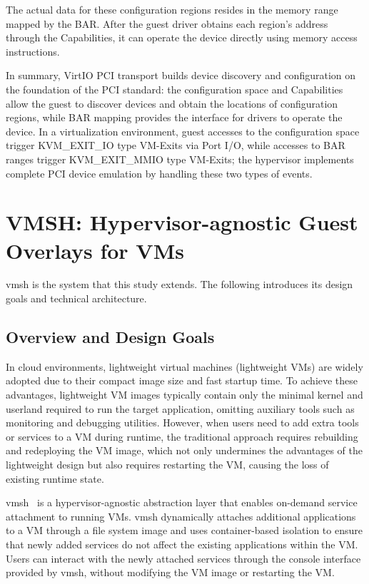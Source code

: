 \begin{ZhChapter}
The actual data for these configuration regions resides in the memory range mapped by the BAR. After the guest driver obtains each region's address through the Capabilities, it can operate the device directly using memory access instructions.

In summary, VirtIO PCI transport builds device discovery and configuration on the foundation of the PCI standard: the configuration space and Capabilities allow the guest to discover devices and obtain the locations of configuration regions, while BAR mapping provides the interface for drivers to operate the device. In a virtualization environment, guest accesses to the configuration space trigger KVM\_EXIT\_IO type VM-Exits via Port I/O, while accesses to BAR ranges trigger KVM\_EXIT\_MMIO type VM-Exits; the hypervisor implements complete PCI device emulation by handling these two types of events.

\section{VMSH: Hypervisor-agnostic Guest Overlays for VMs}
\label{sec:vmsh}

vmsh is the system that this study extends. The following introduces its design goals and technical architecture.

\subsection{Overview and Design Goals}
\label{sec:vmsh-overview}

In cloud environments, lightweight virtual machines (lightweight VMs) are widely adopted due to their compact image size and fast startup time. To achieve these advantages, lightweight VM images typically contain only the minimal kernel and userland required to run the target application, omitting auxiliary tools such as monitoring and debugging utilities. However, when users need to add extra tools or services to a VM during runtime, the traditional approach requires rebuilding and redeploying the VM image, which not only undermines the advantages of the lightweight design but also requires restarting the VM, causing the loss of existing runtime state.

vmsh~\cite{Thalheim2022} is a hypervisor-agnostic abstraction layer that enables on-demand service attachment to running VMs. vmsh dynamically attaches additional applications to a VM through a file system image and uses container-based isolation to ensure that newly added services do not affect the existing applications within the VM. Users can interact with the newly attached services through the console interface provided by vmsh, without modifying the VM image or restarting the VM.


\end{ZhChapter}
